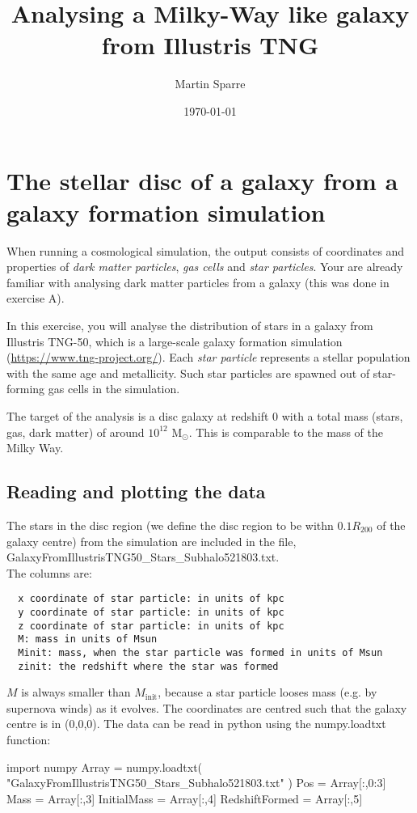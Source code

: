 \documentclass[11pt,a4paper]{article} %
\title{Analysing a Milky-Way like galaxy from Illustris TNG}
\author{Martin Sparre}
\date{\today }
\begin{document}
\section*{The stellar disc of a galaxy from a galaxy formation simulation}

When running a cosmological simulation, the output consists of coordinates and properties of \emph{dark matter particles}, \emph{gas cells} and \emph{star particles}. Your are already familiar with analysing dark matter particles from a galaxy (this was done in exercise A).

In this exercise, you will analyse the distribution of stars in a galaxy from Illustris TNG-50, which is a large-scale galaxy formation simulation (\url{https://www.tng-project.org/}). Each \emph{star particle} represents a stellar population with the same age and metallicity. Such star particles are spawned out of star-forming gas cells in the simulation.

The target of the analysis is a disc galaxy at redshift 0 with a total mass (stars, gas, dark matter) of around $10^{12}$ M$_\odot$. This is comparable to the mass of the Milky Way.

\subsection*{Reading and plotting the data}

The stars in the disc region (we define the disc region to be withn $0.1 R_{200}$ of the galaxy centre) from the simulation are included in the file,\\
{\ttm  GalaxyFromIllustrisTNG50\_Stars\_Subhalo521803.txt}.\\

\noindent{}The columns are:
\begin{verbatim}
  x coordinate of star particle: in units of kpc
  y coordinate of star particle: in units of kpc
  z coordinate of star particle: in units of kpc
  M: mass in units of Msun
  Minit: mass, when the star particle was formed in units of Msun
  zinit: the redshift where the star was formed
\end{verbatim}
$M$ is always smaller than $M_\text{init}$, because a star particle looses mass (e.g. by supernova winds) as it evolves. The coordinates are centred such that the galaxy centre is in (0,0,0). The data can be read in python using the {\ttm numpy.loadtxt} function:

\begin{python}
import numpy
Array = numpy.loadtxt(
"GalaxyFromIllustrisTNG50_Stars_Subhalo521803.txt"
)
Pos = Array[:,0:3]
Mass = Array[:,3]
InitialMass = Array[:,4]
RedshiftFormed = Array[:,5]
\end{python}
\end{document}
